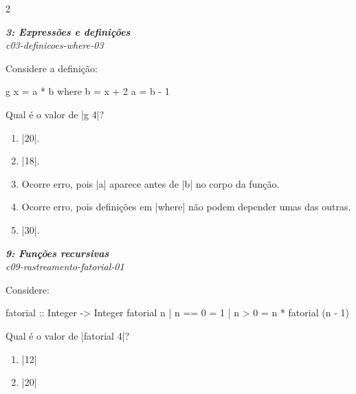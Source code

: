 \documentclass[a4paper,10pt,brazil]{article}
\begin{document}
\begin{multicols}{2}
\begin{enumerate}
\end{enumerate}

\begin{flushright}
  \footnotesize
  \textit{\textbf{3: Expressões e definições}}\\
  \textit{c03-definicoes-where-03}\\

\end{flushright}
Considere a definição:

\begin{haskellcode}
g x = a * b
  where
    b = x + 2
    a = b - 1
\end{haskellcode}

Qual é o valor de \haskellinline|g 4|?

\begin{enumerate}
  \item \haskellinline|20|.

  \item \haskellinline|18|.

  \item Ocorre erro, pois \haskellinline|a| aparece antes de \haskellinline|b| no corpo da função.

  \item Ocorre erro, pois definições em \haskellinline|where| não podem depender umas das outras.

  \item \haskellinline|30|.


\end{enumerate}

\begin{flushright}
  \footnotesize
  \textit{\textbf{9: Funções recursivas}}\\
  \textit{c09-rastreamento-fatorial-01}\\

\end{flushright}
Considere:
\begin{haskellcode}
fatorial :: Integer -> Integer
fatorial n
  | n == 0 = 1
  | n > 0  = n * fatorial (n - 1)
\end{haskellcode}
Qual é o valor de \haskellinline|fatorial 4|?

\begin{enumerate}
  \item \haskellinline|12|

  \item \haskellinline|20|


\end{enumerate}
\end{multicols}
\end{document}
